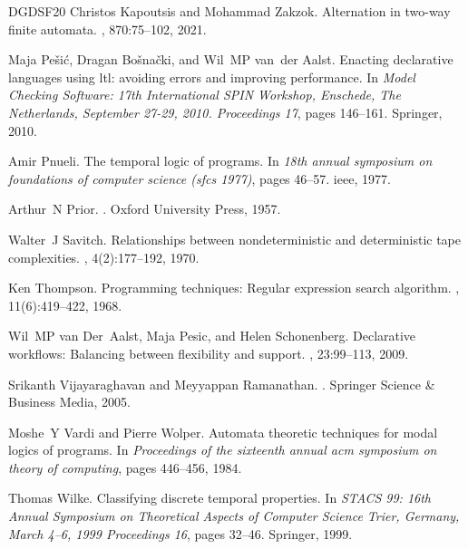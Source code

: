 \documentclass[10pt,a4paper]{amsart}
\theoremstyle{plain}
\theoremstyle{definition}
\theoremstyle{definition}
\DeclareMathOperator{\?}{?}
\begin{document}
\begin{thebibliography}{DGDSF{\etalchar{+}}20}
Christos Kapoutsis and Mohammad Zakzok.
\newblock Alternation in two-way finite automata.
, 870:75--102, 2021.

Maja Pe{\v{s}}i{\'c}, Dragan Bo{\v{s}}na{\v{c}}ki, and Wil~MP van~der Aalst.
\newblock Enacting declarative languages using ltl: avoiding errors and improving performance.
\newblock In {\em Model Checking Software: 17th International SPIN Workshop, Enschede, The Netherlands, September 27-29, 2010. Proceedings 17}, pages 146--161. Springer, 2010.

Amir Pnueli.
\newblock The temporal logic of programs.
\newblock In {\em 18th annual symposium on foundations of computer science (sfcs 1977)}, pages 46--57. ieee, 1977.

Arthur~N Prior.
.
\newblock Oxford University Press, 1957.

Walter~J Savitch.
\newblock Relationships between nondeterministic and deterministic tape complexities.
, 4(2):177--192, 1970.

Ken Thompson.
\newblock Programming techniques: Regular expression search algorithm.
, 11(6):419--422, 1968.

Wil~MP van Der~Aalst, Maja Pesic, and Helen Schonenberg.
\newblock Declarative workflows: Balancing between flexibility and support.
, 23:99--113, 2009.

Srikanth Vijayaraghavan and Meyyappan Ramanathan.
.
\newblock Springer Science \& Business Media, 2005.

Moshe~Y Vardi and Pierre Wolper.
\newblock Automata theoretic techniques for modal logics of programs.
\newblock In {\em Proceedings of the sixteenth annual acm symposium on theory of computing}, pages 446--456, 1984.

Thomas Wilke.
\newblock Classifying discrete temporal properties.
\newblock In {\em STACS 99: 16th Annual Symposium on Theoretical Aspects of Computer Science Trier, Germany, March 4--6, 1999 Proceedings 16}, pages 32--46. Springer, 1999.

\end{thebibliography}
\end{document}
